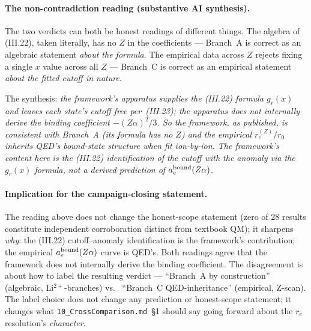 \paragraph{The non-contradiction reading (substantive AI synthesis).}
The two verdicts can both be honest readings of different things. The
algebra of (III.22), taken literally, has no $Z$ in the coefficients ---
Branch~A is correct as an algebraic statement \emph{about the formula}.
The empirical data across $Z$ rejects fixing a single $x$ value across all
$Z$ --- Branch~C is correct as an empirical statement \emph{about the
fitted cutoff in nature}.

The synthesis: \emph{the framework's apparatus supplies the (III.22) formula
$g_r(x)$ and leaves each state's cutoff free per~(III.23); the apparatus
does not internally derive the binding coefficient $-(Z\alpha)^2/3$. So the
framework, as published, is consistent with Branch~A (its formula has no
$Z$) and the empirical $r_e^{(Z)}/r_0$ inherits QED's bound-state structure
when fit ion-by-ion. The framework's content here is the (III.22)
identification of the cutoff with the anomaly via the $g_r(x)$ formula, not
a derived prediction of $a_e^{\rm bound}(Z\alpha)$.}

\paragraph{Implication for the campaign-closing statement.}
The reading above does not change the honest-scope statement (zero of 28
results constitute independent corroboration distinct from textbook QM); it
sharpens \emph{why}: the (III.22) cutoff--anomaly identification is the
framework's contribution; the empirical $a_e^{\rm bound}(Z\alpha)$ curve is
QED's. Both readings agree that the framework does not internally derive
the binding coefficient. The disagreement is about how to label the
resulting verdict ---
``Branch~A by construction'' (algebraic, Li$^{2+}$-branches) vs.~
``Branch~C QED-inheritance'' (empirical, Z-scan).
The label choice does not change any prediction or honest-scope statement;
it changes what \texttt{10\_CrossComparison.md}~\S1 should say going forward
about the $r_e$ resolution's \emph{character}.

